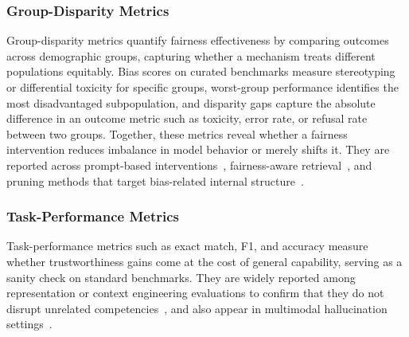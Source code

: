 \subsubsection{Group-Disparity Metrics}
Group-disparity metrics quantify fairness effectiveness by comparing outcomes across demographic groups, capturing whether a mechanism treats different populations equitably. Bias scores on curated benchmarks measure stereotyping or differential toxicity for specific groups, worst-group performance identifies the most disadvantaged subpopulation, and disparity gaps capture the absolute difference in an outcome metric such as toxicity, error rate, or refusal rate between two groups. Together, these metrics reveal whether a fairness intervention reduces imbalance in model behavior or merely shifts it. They are reported across prompt-based interventions~\citep{dwivedi2023breaking, huang2024bias, kamruzzaman2024prompting}, fairness-aware retrieval~\citep{chen2024spica, shrestha2024fairrag}, and pruning methods that target bias-related internal structure~\citep{cai2024locating, zayed2024fairness, ma2025breaking}.

\subsubsection{Task-Performance Metrics}
Task-performance metrics such as exact match, F1, and accuracy measure whether trustworthiness gains come at the cost of general capability, serving as a sanity check on standard benchmarks. They are widely reported among representation or context engineering evaluations to confirm that they do not disrupt unrelated competencies~\citep{li2023iti, bayat2024enhanced, wang2024act, meng2022locating}, and also appear in multimodal hallucination settings~\citep{Park2024ConVisCD, Yuan2024HELPDMH}.


